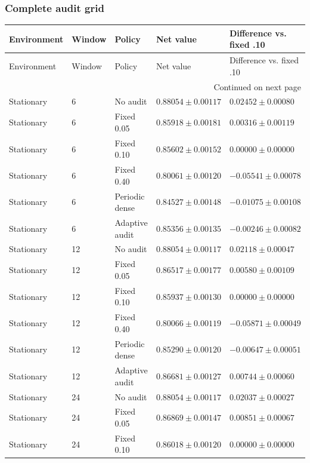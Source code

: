 \subsubsection*{Complete audit grid}
\begingroup\footnotesize\setlength{\tabcolsep}{4pt}

\renewcommand{\arraystretch}{.93}
\begin{longtable}{@{}lllll@{}}
\toprule Environment & Window & Policy & Net value & Difference vs. fixed .10 \\\midrule\endfirsthead
\toprule Environment & Window & Policy & Net value & Difference vs. fixed .10 \\\midrule\endhead
\midrule\multicolumn{5}{r}{Continued on next page}\\\endfoot
\bottomrule\endlastfoot
Stationary & 6 & No audit & $0.88054 \pm 0.00117$ & $0.02452 \pm 0.00080$ \\
Stationary & 6 & Fixed 0.05 & $0.85918 \pm 0.00181$ & $0.00316 \pm 0.00119$ \\
Stationary & 6 & Fixed 0.10 & $0.85602 \pm 0.00152$ & $0.00000 \pm 0.00000$ \\
Stationary & 6 & Fixed 0.40 & $0.80061 \pm 0.00120$ & $-0.05541 \pm 0.00078$ \\
Stationary & 6 & Periodic dense & $0.84527 \pm 0.00148$ & $-0.01075 \pm 0.00108$ \\
Stationary & 6 & Adaptive audit & $0.85356 \pm 0.00135$ & $-0.00246 \pm 0.00082$ \\
Stationary & 12 & No audit & $0.88054 \pm 0.00117$ & $0.02118 \pm 0.00047$ \\
Stationary & 12 & Fixed 0.05 & $0.86517 \pm 0.00177$ & $0.00580 \pm 0.00109$ \\
Stationary & 12 & Fixed 0.10 & $0.85937 \pm 0.00130$ & $0.00000 \pm 0.00000$ \\
Stationary & 12 & Fixed 0.40 & $0.80066 \pm 0.00119$ & $-0.05871 \pm 0.00049$ \\
Stationary & 12 & Periodic dense & $0.85290 \pm 0.00120$ & $-0.00647 \pm 0.00051$ \\
Stationary & 12 & Adaptive audit & $0.86681 \pm 0.00127$ & $0.00744 \pm 0.00060$ \\
Stationary & 24 & No audit & $0.88054 \pm 0.00117$ & $0.02037 \pm 0.00027$ \\
Stationary & 24 & Fixed 0.05 & $0.86869 \pm 0.00147$ & $0.00851 \pm 0.00067$ \\
Stationary & 24 & Fixed 0.10 & $0.86018 \pm 0.00120$ & $0.00000 \pm 0.00000$ \\

\end{longtable}
